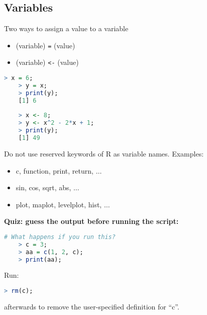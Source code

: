 \documentclass[10pt]{article}
\begin{document}
\subsection{Variables}
Two ways to assign a value to a variable
\begin{itemize}
	\item (variable) \texttt{=} (value)
	\item (variable) \texttt{<-} (value)
\end{itemize}

\begin{lstlisting}[style=displaycode, language=R]
	> x = 6;
	> y = x;
	> print(y);
	[1] 6
	
	> x <- 8;
	> y <- x^2 - 2*x + 1;
	> print(y);
	[1] 49
\end{lstlisting}

Do not use reserved keywords of R as variable names. Examples:
\begin{itemize}
	\item c, function, print, return, $\ldots$
	\item sin, cos, sqrt, abs, $\ldots$
	\item plot, maplot, levelplot, hist, $\ldots$
\end{itemize}

{\bf Quiz: guess the output before running the script:}
\begin{lstlisting}[style=displaycode, language=R]
	# What happens if you run this?
	> c = 3;
	> aa = c(1, 2, c);
	> print(aa);
\end{lstlisting}
Run:
\begin{lstlisting}[style=displaycode, language=R]
	> rm(c);
\end{lstlisting}
afterwards to remove the user-specified definition for ``c''.
\end{document}
